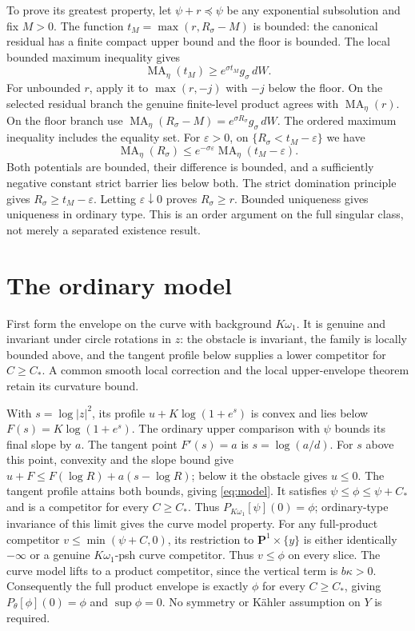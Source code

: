 \documentclass[11pt]{article}
\newcommand{\MA}{\operatorname{MA}}
\newcommand{\Pone}{\mathbf P^1}
\theoremstyle{remark}\newtheorem{remark}[theorem]{Remark}
\begin{document}
To prove its greatest property, let $\psi+r\preceq\psi$ be any exponential
subsolution and fix $M>0$. The function $t_M=\max(r,R_\sigma-M)$ is bounded:
the canonical residual has a finite compact upper bound and the floor is
bounded. The local bounded maximum inequality \cite[Lemma 1.2]{GL} gives
\[
 \MA_\eta(t_M)\geq e^{\sigma t_M}g_\sigma\,dW.
\]
For unbounded $r$, apply it to $\max(r,-j)$ with $-j$ below the floor.
On the selected residual branch the genuine finite-level product agrees
with $\MA_\eta(r)$. On the floor branch use
$\MA_\eta(R_\sigma-M)=e^{\sigma R_\sigma}g_\sigma\,dW$.
The ordered maximum inequality includes the equality set.
For $\varepsilon>0$, on $\{R_\sigma<t_M-\varepsilon\}$ we have
\[
 \MA_\eta(R_\sigma)
 \leq e^{-\sigma\varepsilon}\MA_\eta(t_M-\varepsilon).
\]
Both potentials are bounded, their difference is bounded, and a sufficiently
negative constant strict barrier lies below both. The strict domination
principle \cite[Lemma 4.2]{BGL} gives $R_\sigma\geq t_M-\varepsilon$.
Letting $\varepsilon\downarrow0$ proves $R_\sigma\geq r$.
Bounded uniqueness gives uniqueness in ordinary type. This is an order
argument on the full singular class, not merely a separated existence result.

\section{The ordinary model}

First form the envelope on the curve with background $K\omega_1$.
It is genuine and invariant under circle rotations in $z$: the obstacle
is invariant, the family is locally bounded above, and the tangent profile
below supplies a lower competitor for $C\geq C_*$. A common smooth local
correction and the local upper-envelope theorem retain its curvature bound.

With $s=\log|z|^2$, its profile $u+K\log(1+e^s)$ is convex and lies below
$F(s)=K\log(1+e^s)$. The ordinary upper comparison with $\psi$ bounds its
final slope by $a$. The tangent point $F'(s)=a$ is $s=\log(a/d)$.
For $s$ above this point, convexity and the slope bound give
$u+F\leq F(\log R)+a(s-\log R)$; below it the obstacle gives $u\leq0$.
The tangent profile attains both bounds, giving \eqref{eq:model}.
It satisfies $\psi\leq\phi\leq\psi+C_*$ and is a competitor for every
$C\geq C_*$. Thus $P_{K\omega_1}[\psi](0)=\phi$; ordinary-type invariance of
this limit gives the curve model property.
For any full-product competitor $v\leq\min(\psi+C,0)$, its restriction
to $\Pone\times\{y\}$ is either identically $-\infty$ or a genuine
$K\omega_1$-psh curve competitor. Thus $v\leq\phi$ on every slice.
The curve model lifts to a product competitor, since the vertical term is
$b\kappa>0$. Consequently the full product envelope is exactly $\phi$
for every $C\geq C_*$, giving $P_\theta[\phi](0)=\phi$ and $\sup\phi=0$.
No symmetry or K\"ahler assumption on $Y$ is required.
\end{document}
